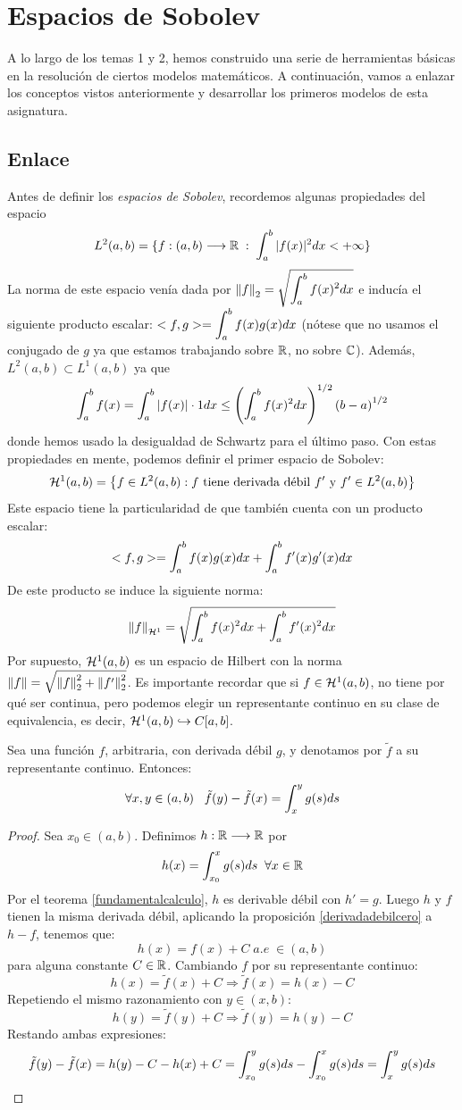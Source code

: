 \chapter{Espacios de Sobolev}

A lo largo de los temas 1 y 2, hemos construido una serie de herramientas básicas en la resolución de ciertos modelos matemáticos. A continuación, vamos a enlazar los conceptos vistos anteriormente y desarrollar los primeros modelos de esta asignatura.

\section{Enlace}

Antes de definir los \textit{espacios de Sobolev}, recordemos algunas propiedades del espacio 
\[L^2(a,b)=\displaystyle\{\funcion{f}{(a,b)}{\R}\;:\; \integral{a}{b}{|f(x)|^2dx<+\infty}\displaystyle\}\]
La norma de este espacio venía dada por $\norm{f}_2=\sqrt{\integral{a}{b}{f(x)^2dx}}$ e inducía el siguiente producto escalar: $<f,g>=\integral{a}{b}{f(x)g(x)dx}$ (nótese que no usamos el conjugado de $g$ ya que estamos trabajando sobre $\R$, no sobre $\C$). Además, $L^2(a,b)\subset L^1(a,b)$ ya que 
\[
\integral{a}{b}{f(x)}=\integral{a}{b}{|f(x)|\cdot 1dx}\leq \left(\integral{a}{b}{f(x)^2dx}\right)^{1/2}\left(b-a\right)^{1/2}
\]
donde hemos usado la desigualdad de Schwartz para el último paso. Con estas propiedades en mente, podemos definir el primer espacio de Sobolev:
\[
\sobolev{1}=\conjunto{f\in\lebesgue{2}: f \text{ tiene derivada débil }f' \text{ y } f'\in\lebesgue{2}}
\]
Este espacio tiene la particularidad de que también cuenta con un producto escalar:
\[
<f,g>=\integral{a}{b}{f(x)g(x)dx}+\integral{a}{b}{f'(x)g'(x)dx}
\]
De este producto se induce la siguiente norma:
\[
\normasobolev{1}{f}=\sqrt{\integral{a}{b}{f(x)^2dx}+\integral{a}{b}{f'(x)^2dx}}
\]
Por supuesto, $\sobolev{1}$ es un espacio de Hilbert con la norma $\norm{f}=\sqrt{\norm{f}^2_2+\norm{f'}_2^2}$. Es importante recordar que si $f\in\sobolev{1}$, no tiene por qué ser continua, pero podemos elegir un representante continuo en su clase de equivalencia, es decir, $\sobolev{1}\hookrightarrow C[a,b]$.
\begin{lemma}
Sea una función $f$, arbitraria, con derivada débil $g$, y denotamos por $\tilde{f}$ a su representante continuo. Entonces:
\[
\forall x,y\in(a,b) \espacio \tilde{f}(y)-\tilde{f}(x)=\integral{x}{y}{g(s)ds}
\]
\end{lemma}
\begin{proof}
Sea $x_0\in(a,b)$. Definimos $\funcion{h}{\R}{\R}$ por 
\[h(x)=\integral{x_0}{x}{g(s)ds} \;\;\forall x\in\R\] 
Por el teorema \ref{fundamentalcalculo}, $h$ es derivable débil con $h'=g$. Luego $h$ y $f$ tienen la misma derivada débil, aplicando la proposición \ref{derivadadebilcero} a $h-f$, tenemos que:
\[
h(x)=f(x)+C \;a.e \;\in(a,b)
\]
para alguna constante $C\in\R$. Cambiando $f$ por su representante continuo:
\[
h(x)=\tilde{f}(x)+C \Rightarrow \tilde{f}(x)=h(x)-C
\]
Repetiendo el mismo razonamiento con $y\in(x,b)$:
\[
h(y)=\tilde{f}(y)+C \Rightarrow \tilde{f}(y)=h(y)-C
\]
Restando ambas expresiones:
\[
\tilde{f}(y)-\tilde{f}(x)=h(y)-C-h(x)+C=\integral{x_0}{y}{g(s)ds}-\integral{x_0}{x}{g(s)ds}=\integral{x}{y}{g(s)ds}
\]
\end{proof}
